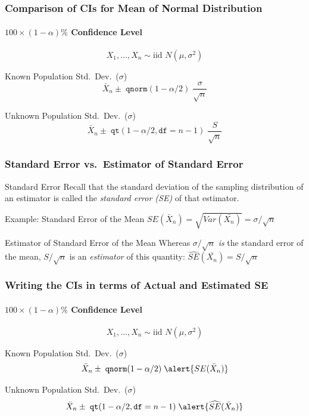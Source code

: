 \documentclass[handout]{beamer}
\begin{document}
\begin{frame}
\frametitle{Comparison of CIs for Mean of Normal Distribution}
\framesubtitle{$100\times(1-\alpha)\%$ Confidence Level}
$$\boxed{X_1, \hdots, X_n \sim \mbox{iid } N(\mu, \sigma^2)}$$


\begin{block}{Known Population Std.\ Dev.\ ($\sigma$)}
	$$\bar{X}_n \pm \; \texttt{qnorm}(1-\alpha/2) \; \frac{\sigma}{\sqrt{n}}$$
\end{block}


\begin{block}{Unknown Population Std.\ Dev.\ ($\sigma$)}
$$\bar{X}_n \pm \; \texttt{qt}(1-\alpha/2, \texttt{df} = n-1) \; \frac{S}{\sqrt{n}}$$
\end{block}
\end{frame}
\begin{frame}
\frametitle{Standard Error vs.\ Estimator of Standard Error}
\begin{block}{Standard Error}
Recall that the standard deviation of  the sampling distribution of an estimator is called the \emph{\alert{standard error} (SE)} of that estimator.
\end{block}
\begin{block}{Example: Standard Error of the Mean}
$SE(\bar{X}_n) = \sqrt{Var\left(\bar{X_n}\right)} = \sigma/\sqrt{n}$
\end{block}



\begin{alertblock}{Estimator of Standard Error of the Mean} Whereas $\sigma/\sqrt{n}$ \alert{\emph{is}} the standard error of the mean, $S/\sqrt{n}$ is an \alert{\emph{estimator}} of this quantity: $\widehat{SE}(\bar{X_n}) = S/\sqrt{n}$
\end{alertblock}
\end{frame}
\begin{frame}
\frametitle{Writing the CIs in terms of Actual and Estimated SE}
\framesubtitle{$100\times(1-\alpha)\%$ Confidence Level}
$$\boxed{X_1, \hdots, X_n \sim \mbox{iid } N(\mu, \sigma^2)}$$

\begin{block}{Known Population Std.\ Dev.\ ($\sigma$)}
	$$\bar{X}_n \pm \; \texttt{qnorm}(1-\alpha/2) \; \alert{SE(\bar{X}_n)}$$
\end{block}

\begin{block}{Unknown Population Std.\ Dev.\ ($\sigma$)}
$$\bar{X}_n \pm \; \texttt{qt}(1-\alpha/2, \texttt{df} = n-1) \; \alert{\widehat{SE}(\bar{X}_n)}$$
\end{block}
\end{frame}
\end{document}
